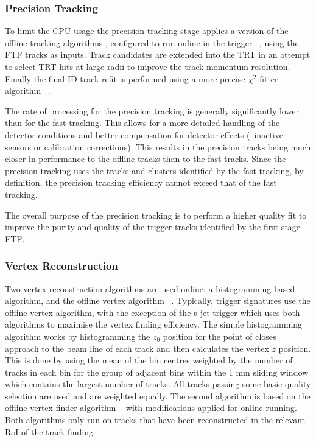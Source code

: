 		\subsubsection*{Precision Tracking}
		To limit the \ac{CPU} usage the precision tracking stage applies a version of the offline tracking algorithms \cite{Cornelissen_2008,ATLAS-CONF-2010-072}, configured to run online in the trigger ~\cite{CERN-LHCC-97-016,Haywood:331064}, using the \ac{FTF} tracks as inputs. Track candidates are extended into the \ac{TRT} in an attempt to select \ac{TRT} hits at large radii to improve the track momentum resolution. Finally the final \ac{ID} track refit is performed using a more precise $\chi^2$ fitter algorithm ~\cite{chi2fit}.
		
		The rate of processing for the precision tracking is generally significantly lower than for the fast tracking.
		This allows for a more detailed handling of the detector conditions and better compensation for detector effects (\ie\ inactive sensors or calibration corrections). This results in the precision tracks being much closer in performance to the offline tracks than to the fast tracks. 
		Since the precision tracking uses the tracks and clusters identified by the fast tracking, by definition, the precision tracking efficiency cannot exceed that of the fast tracking.
		
		The overall purpose of the precision tracking is to perform a higher quality fit to improve the purity and quality of the trigger tracks identified by the first stage \ac{FTF}.
			
			\subsubsection*{Vertex Reconstruction}
		Two vertex reconstruction algorithms are used online: a histogramming based algorithm, and the offline vertex algorithm ~\cite{ferrari2007tracking,ATLAS-CONF-2012-042}. 
		Typically, trigger signatures use the offline vertex algorithm, with the exception of the $b$-jet trigger which uses both algorithms to maximise the vertex finding efficiency. 
		The simple histogramming algorithm works by histogramming the $z_0$ position for the point of closes approach to the beam line of each track and then calculates the vertex $z$ position. 
		This is done by using the mean of the bin centres weighted by the number of tracks in each bin for the group of adjacent bins within the 1 mm sliding window which contains the largest number of tracks. 
		All tracks passing some basic quality selection are used and are weighted equally. 
		The second algorithm is based on the offline vertex finder algorithm ~\cite{ATLAS-CONF-2012-042} with modifications applied for online running. 
		Both algorithms only run on tracks that have been reconstructed in the relevant \ac{RoI} of the track finding.  
		
